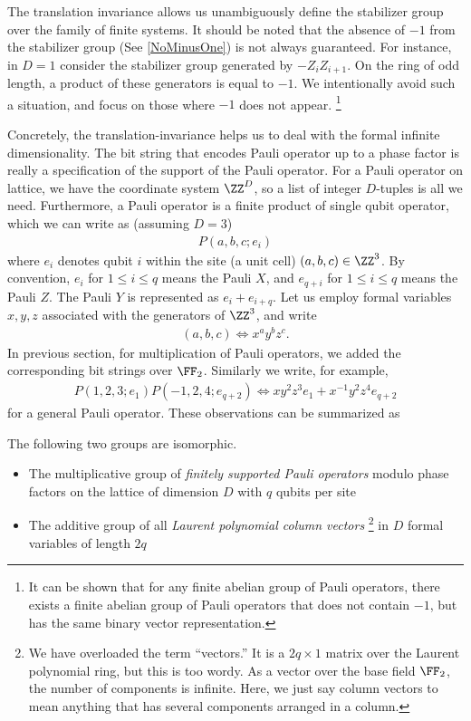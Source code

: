 The translation invariance allows us unambiguously define the stabilizer group
over the family of finite systems.
It should be noted that the absence of $-1$ from the stabilizer group (See \ref{NoMinusOne})
is not always guaranteed.
For instance, in $D=1$ consider the stabilizer group generated by $-Z_i Z_{i+1}$.
On the ring of odd length, a product of these generators is equal to $-1$.
We intentionally avoid such a situation, and focus on those where $-1$ does not appear.%
\footnote{
It can be shown that for any finite abelian group of Pauli operators,
there exists a finite abelian group of Pauli operators that does not contain $-1$,
but has the same binary vector representation.
}

Concretely, the translation-invariance helps us to deal with the formal infinite dimensionality.
The bit string that encodes Pauli operator up to a phase factor
is really a specification of the support of the Pauli operator.
For a Pauli operator on lattice, we have the coordinate system $\ZZ^D$,
so a list of integer $D$-tuples is all we need.
Furthermore,
a Pauli operator is a finite product of single qubit operator,
which we can write as (assuming $D=3$)
\begin{align*}
 P( a,b,c ; e_i )
\end{align*}
where $e_i$ denotes qubit $i$ within the site (a unit cell) $(a,b,c) \in \ZZ^3$.
By convention, $e_i$ for $1 \le i \le q$ means the Pauli $X$,
and $e_{q+i}$ for $1 \le i \le q$ means the Pauli $Z$.
The Pauli $Y$ is represented as $e_{i} + e_{i+q}$.
Let us employ formal variables $x,y,z$ associated with the generators of $\ZZ^3$,
and write
\begin{align*}
 (a,b,c) \Leftrightarrow x^a y^b z^c .
\end{align*}
In previous section, for multiplication of Pauli operators,
we added the corresponding bit strings over $\FF_2$.
Similarly we write, for example,
\begin{align}
 P(1,2,3; e_1 ) P( -1,2,4; e_{q+2} ) \Leftrightarrow x y^2 z^3 e_1 + x^{-1} y^2 z^4 e_{q+2} 
\end{align}
for a general Pauli operator.
These observations can be summarized as
\begin{prop}
The following two groups are isomorphic.
\begin{itemize}
\item The multiplicative group of {\em finitely supported Pauli operators} modulo phase factors
on the lattice of dimension $D$ with $q$ qubits per site
\item The additive group of all {\em Laurent polynomial column vectors}%
\footnote{
We have overloaded the term ``vectors.''
It is a $2q \times 1$ matrix over the Laurent polynomial ring, but this is too wordy.
As a vector over the base field $\FF_2$, the number of components is infinite.
Here, we just say column vectors to mean anything that has several components
arranged in a column.
}
 in $D$ formal variables of length $2q$
\end{itemize}
\end{prop}


